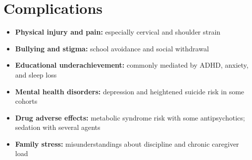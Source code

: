 \section*{Complications}
\begin{itemize}
    \item \textbf{Physical injury and pain:} especially cervical and shoulder strain
    \item \textbf{Bullying and stigma:} school avoidance and social withdrawal
    \item \textbf{Educational underachievement:} commonly mediated by ADHD, anxiety, and sleep loss
    \item \textbf{Mental health disorders:} depression and heightened suicide risk in some cohorts
    \item \textbf{Drug adverse effects:} metabolic syndrome risk with some antipsychotics; sedation with several agents
    \item \textbf{Family stress:} misunderstandings about discipline and chronic caregiver load
\end{itemize}

